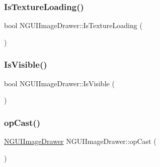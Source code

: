 \hypertarget{class_n_g_u_i_image_drawer_aee021c33fcc86d6e60acf0bdaaa70ab6}{}\label{class_n_g_u_i_image_drawer_aee021c33fcc86d6e60acf0bdaaa70ab6} 
\subsubsection{\texorpdfstring{Is\+Texture\+Loading()}{IsTextureLoading()}}
{\footnotesize\ttfamily bool N\+G\+U\+I\+Image\+Drawer\+::\+Is\+Texture\+Loading (\begin{DoxyParamCaption}{ }\end{DoxyParamCaption})}

\hypertarget{class_n_g_u_i_image_drawer_af90ab84e6704e1f0ca7fcc4817232cc4}{}\label{class_n_g_u_i_image_drawer_af90ab84e6704e1f0ca7fcc4817232cc4} 
\subsubsection{\texorpdfstring{Is\+Visible()}{IsVisible()}}
{\footnotesize\ttfamily bool N\+G\+U\+I\+Image\+Drawer\+::\+Is\+Visible (\begin{DoxyParamCaption}{ }\end{DoxyParamCaption})}

\hypertarget{class_n_g_u_i_image_drawer_a015eb5a3a7018778b870d471e38bd7ad}{}\label{class_n_g_u_i_image_drawer_a015eb5a3a7018778b870d471e38bd7ad} 
\subsubsection{\texorpdfstring{op\+Cast()}{opCast()}}
{\footnotesize\ttfamily \hyperlink{class_n_g_u_i_image_drawer}{N\+G\+U\+I\+Image\+Drawer} N\+G\+U\+I\+Image\+Drawer\+::op\+Cast (\begin{DoxyParamCaption}{ }\end{DoxyParamCaption})}

\hypertarget{class_n_g_u_i_image_drawer_a7589869394a794dfee6f36e747bd9277}{}\label{class_n_g_u_i_image_drawer_a7589869394a794dfee6f36e747bd9277} 
